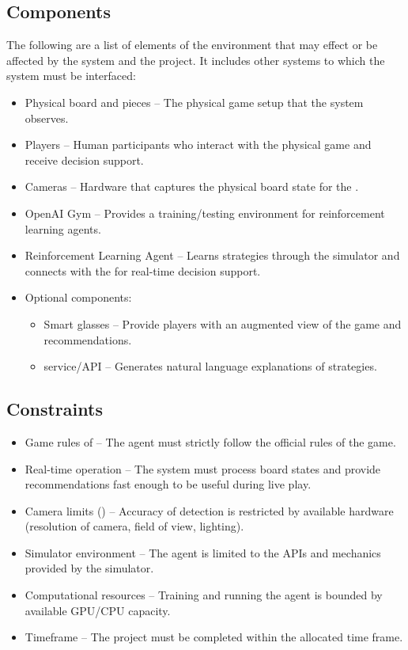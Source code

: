 \documentclass{article}
\begin{document}
\subsection{Components}\label{subsec:components2}
\raggedright The following are a list of elements of the environment that may effect or be affected by the system and the project. It includes other systems to which the system must be interfaced:
\begin{itemize}
    \item {Physical \emph{\Catan{}} board and pieces} – The physical game setup that the system observes.
    \item {Players} – Human participants who interact with the physical game and receive decision support.
    \item {Cameras} – Hardware that captures the physical board state for the \DigitalTwin{}.
    \item {OpenAI Gym} – Provides a training/testing environment for reinforcement learning agents.
    \item {Reinforcement Learning Agent} – Learns strategies through the simulator and connects with the \DigitalTwin{} for real-time decision support.
    \item {Optional components:}
    \begin{itemize}
        \item {Smart glasses} – Provide players with an augmented view of the game and recommendations.
        \item {\LLM{} service/API} – Generates natural language explanations of strategies.
    \end{itemize}
\end{itemize}

\subsection{Constraints}\label{subsec:constraints}
\begin{itemize}
    \item {Game rules of \emph{\Catan{}}} – The \RL{} agent must strictly follow the official rules of the game.
    \item {Real-time operation} – The system must process board states and provide recommendations fast enough to be useful during live play.
    \item {Camera limits (\CV{})} – Accuracy of \GameState{} detection is restricted by available hardware (resolution of camera, field of view, lighting).
    \item {Simulator environment} – The \RL{} agent is limited to the APIs and mechanics provided by the \emph{\Catan{}} simulator.
    \item {Computational resources} – Training and running the \RL{} agent is bounded by available GPU/CPU capacity.
    \item {Timeframe} – The project must be completed within the allocated time frame.
\end{itemize}
\end{document}
